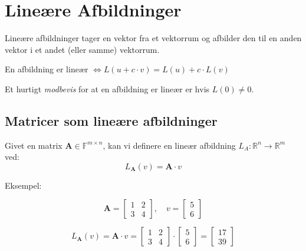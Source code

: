 \section{Lineære Afbildninger}

Lineære afbildninger tager en vektor fra et vektorrum og afbilder den til en anden vektor i et andet (eller samme) vektorrum.

En afbildning er lineær $\iff L(u + c \cdot v) = L(u) + c \cdot L(v) $


Et hurtigt \emph{modbevis} for at en afbildning er lineær er hvis $ L(0) \ne 0 $.

\subsection{Matricer som lineære afbildninger}

Givet en matrix \( \mathbf{A} \in \mathbb{F}^{m \times n}\), kan vi definere en lineær afbildning \( L_A : \mathbb{R}^n \rightarrow \mathbb{R}^m \) ved:
\[
    L_\mathbf{A}(v) = \mathbf{A} \cdot v
\]

Eksempel:

\begin{minipage}{0.45\textwidth}
    \[
    \mathbf{A} = \begin{bmatrix}
        1 & 2 \\
        3 & 4
    \end{bmatrix}, \quad v = \begin{bmatrix}
        5 \\
        6
    \end{bmatrix}
    \]
\end{minipage}
\hfill
\begin{minipage}{0.45\textwidth}
    \[
    L_\mathbf{A}(v) = \mathbf{A} \cdot v = \begin{bmatrix}
        1 & 2 \\
        3 & 4
    \end{bmatrix} \cdot \begin{bmatrix}
        5 \\
        6
    \end{bmatrix} = \begin{bmatrix}
        17 \\
        39
    \end{bmatrix}
    \]
\end{minipage}


